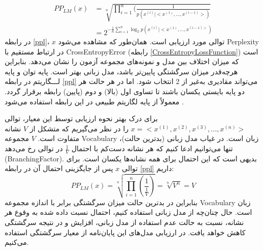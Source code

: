  \begin{equation}\label{ppl}
 \begin{split}
 	PP_{LM}(x) & = \sqrt[n]{\prod_{i=1}^n(\frac{1}{p(x^{(i)}|<x^{(1)}, ..., x^{(i-1)}>)}} \\
 	& = 2^{-\frac{1}{n}\sum_{i=1}^n\log_{2}{p(x^{(i)}|<x^{(1)}, ..., x^{(i-1)>})}}
 \end{split}
 \end{equation}
در رابطه 
\ref{ppl}،
$ x $
 توالی مورد ارزیابی است. همان‌طور که مشاهده می‌شود \gls{Perplexity} در ارتباط مستقیم با \gls{CrossEntropyError} (رابطه \ref{CrossEntropyLossFunction}) است که میزان اختلاف بین مدل و نمونه‌های مجموعه آزمون را نشان می‌دهد. بنابراین هرچه‌قدر میزان سرگشتگی پایین‌تر باشد، مدل زبانی بهتر است. پایه توان و پایه لـــگاریتم در رابطه \ref{ppl} می‌تواند مقادیری به‌غیر از 2 انتخاب شود. اما در هر حالت هر دو پایه بایستی یکسان باشند تا تساوی اول (بالا) و دوم (پایین) رابطه برقرار گردد. معمولاً از پایه لگاریتم طبیعی در این رابطه استفاده می‌شود 
\cite{DBLP:journals/corr/AbadiABBCCCDDDG16}.

برای درک بهتر نحوه ارزیابی توسط این معیار، توالی 
$ x = <x^{(1)}, x^{(2)}, x^{(3)}, ..., x^{(n)}> $
را در نظر می‌گیریم که متشکل از $ V $ نشانه متفاوت است. $ V $ مجموعه \gls{Vocabulary} زبان است. در غیاب مدل زبانی (بدترین حالت)، تنها می‌توانیم ادعا کنیم که هر نشانه دست‌کم با احتمال 
$ \frac{1}{V} $
در توالی رخ می‌دهد (\gls{BranchingFactor}). بدیهی است که این احتمال برای همه نشانه‌ها یکسان است. برای توالی $ x $ پس از جایگزینی احتمال آن در رابطه  \ref{ppl} داریم:
\begin{equation*}
PP_{LM}(x) = \sqrt[n]{\prod_{i=1}^n(\frac{1}{\frac{1}{V}})} = \sqrt[n]{V^{n}} = V
\end{equation*} 
 بنابراین در بدترین حالت میزان سرگشتگی برابر با اندازه مجموعه \gls{Vocabulary} زبان است. حال چنان‌چه از مدل زبانی استفاده کنیم، احتمال نسبت داده شده به وقوع هر نشانه، نسبت به حالت عدم استفاده از مدل زبانی، افزایش و در نتیجه سرگشتگی کاهش خواهد یافت. در ارزیابی مدل‌های این پایان‌نامه از معیار سرگشتگی استفاده می‌کنیم. 
 
 
 
 
 
 
